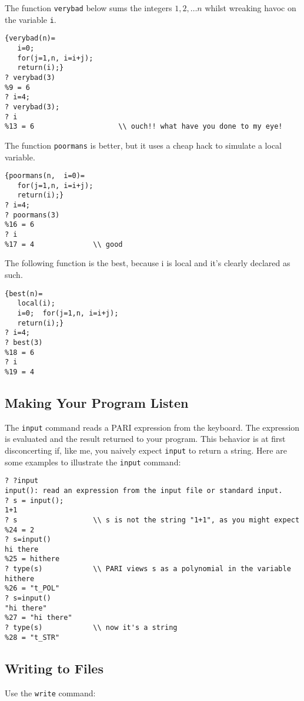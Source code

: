 \documentclass[11pt]{report}
\begin{document}
\begin{example}
  The function {\tt verybad} below sums the integers $1, 2,\ldots n$
  whilst wreaking havoc on the variable {\tt i}.
  \begin{verbatim}
{verybad(n)=
   i=0;
   for(j=1,n, i=i+j);
   return(i);}
? verybad(3)
%9 = 6
? i=4;
? verybad(3);
? i                        
%13 = 6                    \\ ouch!! what have you done to my eye!
\end{verbatim}
  The function {\tt poormans} is better, but it uses a cheap hack to
  simulate a local variable.
  \begin{verbatim}
{poormans(n,  i=0)=   
   for(j=1,n, i=i+j);
   return(i);}
? i=4;
? poormans(3)
%16 = 6
? i
%17 = 4              \\ good
\end{verbatim}
  The following function is the best, because i is local and it's
  clearly declared as such.
  \begin{verbatim}
{best(n)=
   local(i);
   i=0;  for(j=1,n, i=i+j);
   return(i);}
? i=4;
? best(3)
%18 = 6
? i
%19 = 4
\end{verbatim}
\end{example}




\subsection{Making Your Program Listen}
The {\tt input} command reads a PARI expression from the keyboard.
The expression is evaluated and the result returned to your program.
This behavior is at first disconcerting if, like me, you naively
expect {\tt input} to return a string.
Here are some examples to illustrate the {\tt input} command:
\begin{verbatim}
? ?input
input(): read an expression from the input file or standard input.
? s = input();
1+1
? s                  \\ s is not the string "1+1", as you might expect
%24 = 2         
? s=input()
hi there
%25 = hithere
? type(s)            \\ PARI views s as a polynomial in the variable hithere
%26 = "t_POL"
? s=input()          
"hi there"
%27 = "hi there"
? type(s)            \\ now it's a string
%28 = "t_STR"
\end{verbatim}



\subsection{Writing to Files}
Use the {\tt write} command:
\end{document}
